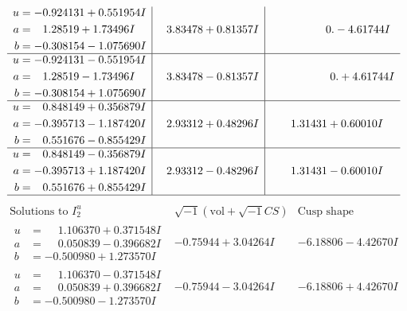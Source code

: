 \documentclass[1p]{elsarticle_modified}
\theoremstyle{definition}
\newcommand{\I}{\sqrt{-1}}
\begin{document}
$$\begin{array}{c|c|c}
\begin{aligned}
u &= -0.924131 + 0.551954 I \\
a &= \phantom{-}1.28519 + 1.73496 I \\
b &= -0.308154 - 1.075690 I\end{aligned}
 & \phantom{-}3.83478 + 0.81357 I & \phantom{-0.000000 } 0. - 4.61744 I \\ \hline\begin{aligned}
u &= -0.924131 - 0.551954 I \\
a &= \phantom{-}1.28519 - 1.73496 I \\
b &= -0.308154 + 1.075690 I\end{aligned}
 & \phantom{-}3.83478 - 0.81357 I & \phantom{-0.000000 -}0. + 4.61744 I \\ \hline\begin{aligned}
u &= \phantom{-}0.848149 + 0.356879 I \\
a &= -0.395713 - 1.187420 I \\
b &= \phantom{-}0.551676 - 0.855429 I\end{aligned}
 & \phantom{-}2.93312 + 0.48296 I & \phantom{-}1.31431 + 0.60010 I \\ \hline\begin{aligned}
u &= \phantom{-}0.848149 - 0.356879 I \\
a &= -0.395713 + 1.187420 I \\
b &= \phantom{-}0.551676 + 0.855429 I\end{aligned}
 & \phantom{-}2.93312 - 0.48296 I & \phantom{-}1.31431 - 0.60010 I\\
 \hline 
 \end{array}$$\newpage$$\begin{array}{c|c|c}  
\text{Solutions to }I^u_{2}& \I (\text{vol} + \sqrt{-1}CS) & \text{Cusp shape}\\
 \hline 
\begin{aligned}
u &= \phantom{-}1.106370 + 0.371548 I \\
a &= \phantom{-}0.050839 - 0.396682 I \\
b &= -0.500980 + 1.273570 I\end{aligned}
 & -0.75944 + 3.04264 I & -6.18806 - 4.42670 I \\ \hline\begin{aligned}
u &= \phantom{-}1.106370 - 0.371548 I \\
a &= \phantom{-}0.050839 + 0.396682 I \\
b &= -0.500980 - 1.273570 I\end{aligned}
 & -0.75944 - 3.04264 I & -6.18806 + 4.42670 I \\ \hline\begin{aligned}

\end{aligned}
\end{array}$$
\end{document}
